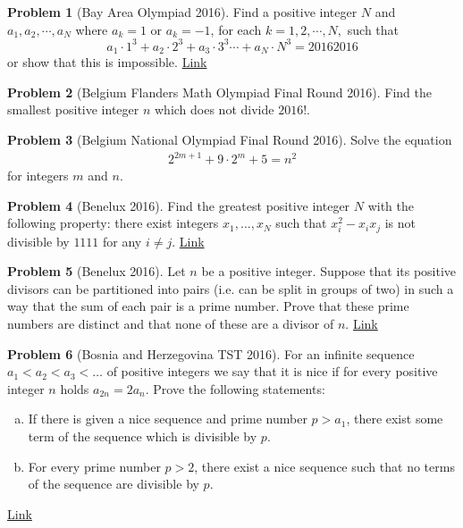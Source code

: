 \documentclass[]{article}
\theoremstyle{definition}
\newtheorem{problem}{Problem}
\begin{document}
	
\begin{problem}[Bay Area Olympiad 2016]
	Find a positive integer $N$ and $a_1, a_2, \cdots, a_N$ where $a_k = 1$ or $a_k = -1$, for each $k=1,2,\cdots,N,$ such that $$a_1 \cdot 1^3 + a_2 \cdot 2^3 + a_3 \cdot 3^3 \cdots + a_N \cdot N^3 = 20162016$$or show that this is impossible. \hfill \href{http://artofproblemsolving.com/community/c6h1203525p5929703}{Link}
\end{problem}


\begin{problem}[Belgium Flanders Math Olympiad Final Round 2016]
	Find the smallest positive integer $n$ which does not divide $2016!$.
\end{problem}



\begin{problem}[Belgium National Olympiad Final Round 2016]
	Solve the equation
		\begin{align*}
			2^{2m+1}+9\cdot2^m+5=n^2
		\end{align*}
	for integers $m$ and $n$.
\end{problem}





\begin{problem}[Benelux 2016]
	Find the greatest positive integer $N$ with the following property: there exist integers $x_1, \dots, x_N$ such that $x^2_i - x_ix_j$ is not divisible by $1111$ for any $i\ne j.$ \hfill \href{http://artofproblemsolving.com/community/c6h1236281p6284414}{Link}
\end{problem}


	
\begin{problem}[Benelux 2016]
	Let $n$ be a positive integer. Suppose that its positive divisors can be partitioned into pairs (i.e. can be split in groups of two) in such a way that the sum of each pair is a prime number. Prove that these prime numbers are distinct and that none of these are a divisor of $n.$ \hfill \href{http://artofproblemsolving.com/community/c6h1236282p6284421}{Link}
\end{problem}


	
\begin{problem}[Bosnia and Herzegovina TST 2016]
	For an infinite sequence $a_1<a_2<a_3< \dots$ of positive integers we say that it is nice if for every positive integer $n$ holds $a_{2n}=2a_n$. Prove the following statements:
		\begin{enumerate}[(a)]
			\item If there is given a nice sequence and prime number $p>a_1$, there exist some term of the sequence which is divisible by $p$.
			\item For every prime number $p>2$, there exist a nice sequence such that no terms of the sequence are divisible by $p$.
		\end{enumerate}
	\flushright \href{http://artofproblemsolving.com/community/c6h1243216p6360340}{Link}
\end{problem}
\end{document}

